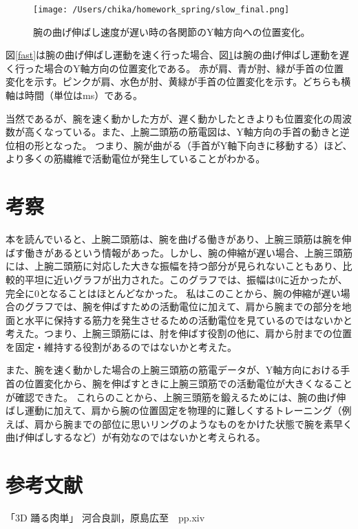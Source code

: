 \documentclass{jsarticle}
\begin{document}
\begin{figure}[!h]
\begin{center}
\texttt{[image: /Users/chika/homework\_spring/slow\_final.png]}
\caption{腕の曲げ伸ばし速度が遅い時の各関節のY軸方向への位置変化。}
\label{slow}
\end{center}
\end{figure}





図\ref{fast}は腕の曲げ伸ばし運動を速く行った場合、図\ref{slow}は腕の曲げ伸ばし運動を遅く行った場合のY軸方向の位置変化である。
赤が肩、青が肘、緑が手首の位置変化を示す。ピンクが肩、水色が肘、黄緑が手首の位置変化を示す。どちらも横軸は時間（単位はms）である。

当然であるが、腕を速く動かした方が、遅く動かしたときよりも位置変化の周波数が高くなっている。また、上腕二頭筋の筋電図は、Y軸方向の手首の動きと逆位相の形となった。
つまり、腕が曲がる（手首がY軸下向きに移動する）ほど、より多くの筋繊維で活動電位が発生していることがわかる。

\section{考察}

本を読んでいると、上腕二頭筋は、腕を曲げる働きがあり、上腕三頭筋は腕を伸ばす働きがあるという情報があった\cite{reference}。しかし、腕の伸縮が遅い場合、上腕三頭筋には、上腕二頭筋に対応した大きな振幅を持つ部分が見られないこともあり、比較的平坦に近いグラフが出力された。このグラフでは、振幅は0に近かったが、完全に0となることはほとんどなかった。
私はこのことから、腕の伸縮が遅い場合のグラフでは、腕を伸ばすための活動電位に加えて、肩から腕までの部分を地面と水平に保持する筋力を発生させるための活動電位を見ているのではないかと考えた。つまり、上腕三頭筋には、肘を伸ばす役割の他に、肩から肘までの位置を固定・維持する役割があるのではないかと考えた。

また、腕を速く動かした場合の上腕三頭筋の筋電データが、Y軸方向における手首の位置変化から、腕を伸ばすときに上腕三頭筋での活動電位が大きくなることが確認できた。
これらのことから、上腕三頭筋を鍛えるためには、腕の曲げ伸ばし運動に加えて、肩から腕の位置固定を物理的に難しくするトレーニング（例えば、肩から腕までの部位に思いリングのようなものをかけた状態で腕を素早く曲げ伸ばしするなど）が有効なのではないかと考えられる。

\section{参考文献}
\begin{thebibliography}{9}
   「3D 踊る肉単」 河合良訓，原島広至　pp.xiv
\end{thebibliography}
\end{document}
